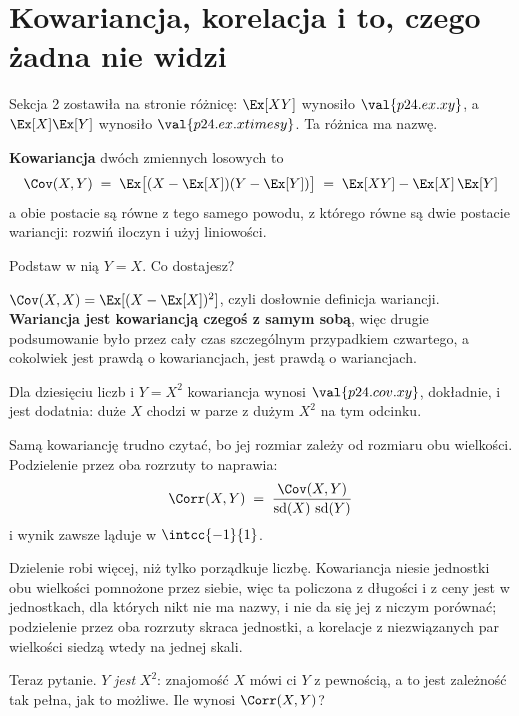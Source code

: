 \section{Kowariancja, korelacja i to, czego żadna nie widzi}
\label{sec:P24-covariance}

\begin{fr}
Sekcja 2 zostawiła na stronie różnicę: $\Ex[XY]$ wynosiło $\val{p24.ex.xy}$, a
$\Ex[X]\Ex[Y]$ wynosiło $\val{p24.ex.xtimesy}$. Ta różnica ma nazwę.

\textbf{Kowariancja} dwóch zmiennych losowych to
\[ \Cov(X, Y) \;=\; \Ex\bigl[(X - \Ex[X])(Y - \Ex[Y])\bigr]
   \;=\; \Ex[XY] - \Ex[X]\,\Ex[Y] \]
a obie postacie są równe z tego samego powodu, z którego równe są dwie
postacie wariancji: rozwiń iloczyn i użyj liniowości.

Podstaw w nią $Y = X$. Co dostajesz?
\dotline
\nextframe
\end{fr}

\begin{fr}

$\Cov(X, X) = \Ex[(X - \Ex[X])^{2}]$, czyli dosłownie definicja wariancji.
\textbf{Wariancja jest kowariancją czegoś z samym sobą}, więc drugie
podsumowanie było przez cały czas szczególnym przypadkiem czwartego, a
cokolwiek jest prawdą o kowariancjach, jest prawdą o wariancjach.

Dla dziesięciu liczb i $Y = X^{2}$ kowariancja wynosi $\val{p24.cov.xy}$,
dokładnie, i jest dodatnia: duże $X$ chodzi w parze z dużym $X^{2}$ na tym
odcinku.
\end{fr}

\begin{fr}
Samą kowariancję trudno czytać, bo jej rozmiar zależy od rozmiaru obu
wielkości. Podzielenie przez oba rozrzuty to naprawia:
\[ \Corr(X, Y) \;=\; \frac{\Cov(X, Y)}
   {\operatorname{sd}(X)\,\operatorname{sd}(Y)} \]
i wynik zawsze ląduje w $\intcc{-1}{1}$.

Dzielenie robi więcej, niż tylko porządkuje liczbę. Kowariancja niesie
jednostki obu wielkości pomnożone przez siebie, więc ta policzona z długości i
z ceny jest w jednostkach, dla których nikt nie ma nazwy, i nie da się jej z
niczym porównać; podzielenie przez oba rozrzuty skraca jednostki, a korelacje
z niezwiązanych par wielkości siedzą wtedy na jednej skali.

Teraz pytanie. $Y$ \emph{jest} $X^{2}$: znajomość $X$ mówi ci $Y$ z pewnością,
a to jest zależność tak pełna, jak to możliwe. Ile wynosi $\Corr(X, Y)$?
\dotline
\nextframe
\end{fr}

